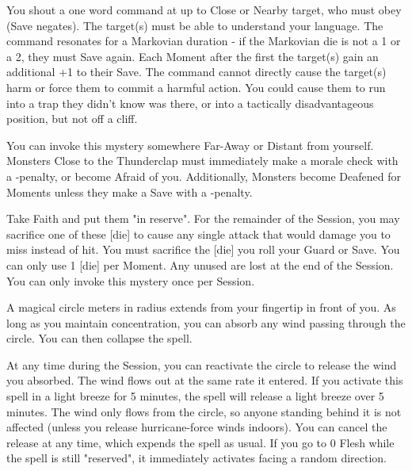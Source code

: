 {You shout a one word command at up to \DICE Close or Nearby target, who must obey (Save negates).  The target(s) must be able to understand your language.  The command resonates for a Markovian duration - if the Markovian die is not a 1 or a 2, they must Save again.  Each Moment after the first the target(s) gain an additional +1 to their Save.  The command cannot directly cause the target(s) harm or force them to commit a harmful action.  You could cause them to run into a trap they didn't know was there, or into a tactically disadvantageous position, but not off a cliff.

\MYSTERY [
  Name = Thunderclap,
  Link = arcana-mystery-thunderclap,
  Paradigm = Elements,
  Save = Y (neg.),
  Duration = Instant,
  Target = Far-Away or Distant
]

You can invoke this mystery somewhere Far-Away or Distant from yourself.  Monsters Close to the Thunderclap must immediately make a morale check with a -\DICE penalty, or become Afraid of you.  Additionally, Monsters become Deafened for \DICE Moments unless they make a Save with a -\DICE penalty.

\newpage

\MYSTERY [
  Name = Armor of Winds,
  Link = arcana-mystery-armor-of-winds,
  Paradigm = Entropy,
  Save = n/a,
  Duration = Session,
  Target = Self
]

Take \DICE Faith and put them "in reserve".  For the remainder of the Session, you may sacrifice one of these [die] to cause any single  attack that would damage you to miss instead of hit.  You must sacrifice the [die]  you roll your Guard or Save.  You can only use 1 [die] per Moment.  Any unused \DICE are lost at the end of the Session.  You can only invoke this mystery once per Session.

\MYSTERY [
  Name = Capture Wind,
  Link = arcana-mystery-capture-wind,
  Paradigm = Elements,
  Save = N,
  Duration = Concentration or Session,
  Target = See Below
]

A magical circle \DICE meters in radius extends from your fingertip in front of you. As long as you maintain concentration, you can absorb any wind passing through the circle. You can then collapse the spell. 

At any time during the Session, you can reactivate the circle to release the wind you absorbed.  The wind flows out at the same rate it entered. If you activate this spell in a light breeze for 5 minutes, the spell will release a light breeze over 5 minutes. The wind only flows from the circle, so anyone standing behind it is not affected (unless you release hurricane-force winds indoors). You can cancel the release at any time, which expends the spell as usual. If you go to 0 Flesh while the spell is still "reserved", it immediately activates facing a random direction.  

}

